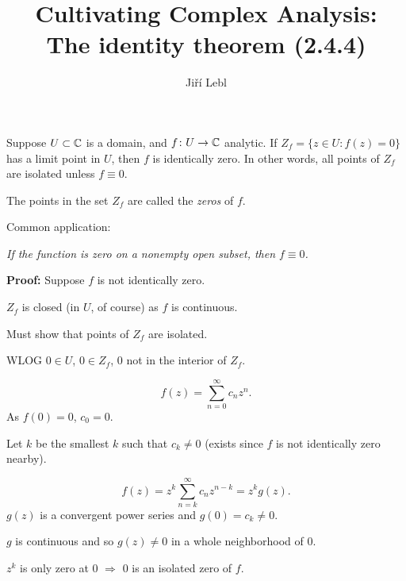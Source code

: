 \documentclass[10pt,aspectratio=169]{beamer}
\author{Ji\v{r}\'i Lebl}
\institute[OSU]{%
Departemento pri Matematiko de Oklahoma {\^S}tata Universitato}
\title{Cultivating Complex Analysis:\\%
The identity theorem (2.4.4)}
\date{}
\begin{document}
\begin{frame}
\titlepage
\end{frame}

\begin{frame}
\begin{theorem}[Identity]
Suppose $U \subset {\mathbb{C}}$ is a domain, 
and $f \colon U \to {\mathbb{C}}$ analytic.
If $Z_f = \bigl\{ z \in U : f(z) = 0 \bigr\}$
has a limit point in $U$, then $f$ is identically zero.
In other words, all points of $Z_f$ are isolated unless $f \equiv 0$.
\end{theorem}

\pause

\begin{definition}
The points in the set $Z_f$ are called the \emph{zeros} of $f$.
\end{definition}

\pause
\medskip

Common application:

\pause

\emph{If the function is zero on a nonempty open subset, then $f \equiv 0$.}

\end{frame}

\begin{frame}

\textbf{Proof:}
Suppose $f$ is not identically zero.

\medskip
\pause

$Z_f$ is closed (in $U$, of course) as $f$ is continuous.

\medskip
\pause

Must show that points of $Z_f$ are isolated.

\medskip
\pause

WLOG $0 \in U$, $0 \in Z_f$, $0$ not  in the interior of $Z_f$.

\pause

\[
f(z) = \sum_{n=0}^\infty c_n z^n .
\]
As $f(0) = 0$, $c_0 =0$.
\pause
\medskip

Let $k$ be the smallest $k$ such that $c_k \not=0$ (exists since $f$
is not identically zero nearby).

\pause

\[
f(z) = z^k \sum_{n=k}^\infty c_n z^{n-k} = z^k g(z) .
\]
$g(z)$ is a convergent power series and $g(0) = c_k \not=
0$.

\pause
\medskip

$g$ is continuous and so $g(z) \not= 0$ in a whole neighborhood of $0$.

\pause
\medskip

$z^k$ is only zero at $0$ $\Rightarrow$ $0$ is an isolated zero of $f$.

\end{frame}
\end{document}
